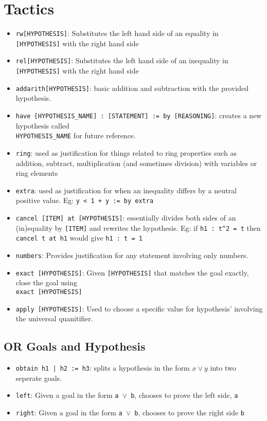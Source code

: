 \documentclass{exam}
\begin{document}
    \pagestyle{headandfoot}
    \runningheadrule
    \firstpageheadrule
    \runningfooter{}{\thepage}{}
    \firstpagefooter{}{}{}

    \section*{Tactics}
    \begin{itemize}
        \item \verb|rw[HYPOTHESIS]|: Substitutes the left hand side of an equality in \texttt{[HYPOTHESIS]} with the right hand side
        \item \verb|rel[HYPOTHESIS]|: Substitutes the left hand side of an inequality in \texttt{[HYPOTHESIS]} with the right hand side
        \item \verb|addarith[HYPOTHESIS]|: basic addition and subtraction with the provided hypothesis. 
        \item \verb|have [HYPOTHESIS_NAME] : [STATEMENT] := by [REASONING]|: creates a new hypothesis called \\ \verb|HYPOTHESIS_NAME| for future reference. 
        \item \verb|ring|: used as justification for things related to ring properties such as addition, subtract, multiplication (and sometimes division) with variables or ring elements
        \item \verb|extra|: used as justification for when an inequality differs by a neutral positive value. Eg: \texttt{y < 1 + y := by extra}
        \item \verb|cancel [ITEM] at [HYPOTHESIS]|: essentially divides both sides of an (in)equality by \verb|[ITEM]| and rewrites the hypothesis. Eg: if \texttt{h1 : t\^{}2 = t} then \texttt{cancel t at h1} would give \texttt{h1 : t = 1}
        \item \verb|numbers|: Provides justification for any statement involving only numbers.
        \item \verb|exact [HYPOTHESIS]|: Given \texttt{[HYPOTHESIS]} that matches the goal exactly, close the goal using \\ \verb|exact [HYPOTHESIS]|
        \item \verb|apply [HYPOTHESIS]|: Used to choose a specific value for hypothesis' involving the universal quanitifier.
    \end{itemize}
    \subsection*{OR Goals and Hypothesis}
    \begin{itemize}
        \item \verb+obtain h1 | h2 := h3+: splits a hypothesis in the form $x \lor y$ into two seperate goals.
        \item \verb|left|: Given a goal in the form \texttt{a $\lor$ b}, chooses to prove the left side, \texttt{a}
        \item \verb|right|: Given a goal in the form \texttt{a $\lor$ b}, chooses to prove the right side \texttt{b}
    \end{itemize}
\end{document}
